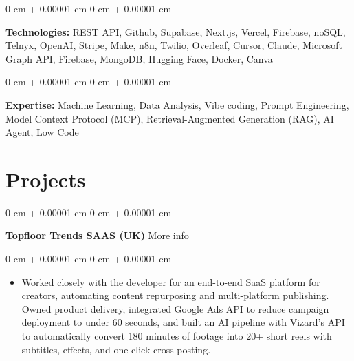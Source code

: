 \documentclass[10pt, letterpaper]{article}
\newenvironment{highlights}{
    \begin{itemize}[
        topsep=0.10 cm,
        parsep=0.10 cm,
        partopsep=0pt,
        itemsep=0pt,
        leftmargin=0 cm + 10pt
    ]
}{
    \end{itemize}
} %
\newenvironment{onecolentry}{
    \begin{adjustwidth}{
        0 cm + 0.00001 cm
    }{
        0 cm + 0.00001 cm
    }
}{
    \end{adjustwidth}
} %
\newenvironment{twocolentry}[2][]{
    \onecolentry
    \def\secondColumn{#2}
    \setcolumnwidth{\fill, 4.5 cm}
    \begin{paracol}{2}
}{
    \switchcolumn \raggedleft \secondColumn
    \end{paracol}
    \endonecolentry
} %
\begin{document}
                \vspace{0.2 cm}
            
                \begin{onecolentry}
                    \textbf{Technologies:} REST API, Github, Supabase, Next.js, Vercel, Firebase, noSQL, Telnyx, OpenAI, Stripe, Make, n8n, Twilio, Overleaf, Cursor, Claude, Microsoft Graph API, Firebase, MongoDB, Hugging Face, Docker, Canva
                \end{onecolentry}
    
                \vspace{0.2 cm}
            
                \begin{onecolentry}
                    \textbf{Expertise:} Machine Learning, Data Analysis, Vibe coding, Prompt Engineering, Model Context Protocol (MCP), Retrieval-Augmented Generation (RAG), AI Agent, Low Code
                \end{onecolentry}
    
    


    \section{Projects}


        \begin{twocolentry}{
            \href{https://codemypixel.com/top-floor-trends-case-study/}{More info}
        }
            \href{https://topfloortrends.com/}{\textbf{Topfloor Trends SAAS (UK)}}\end{twocolentry}

        \vspace{0.10 cm}
        \begin{onecolentry}
            \begin{highlights}
                \item Worked closely with the developer for an end-to-end SaaS platform for creators, automating content repurposing and multi-platform publishing. Owned product delivery, integrated Google Ads API to reduce campaign deployment to under 60 seconds, and built an AI pipeline with Vizard's API to automatically convert 180 minutes of footage into 20+ short reels with subtitles, effects, and one-click cross-posting.
            \end{highlights}
        \end{onecolentry}


        \vspace{0.2 cm}
\end{document}
